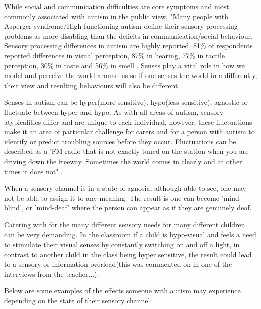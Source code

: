 \documentclass[11pt]{report}
\begin{document}
While social and communication difficulties are core symptoms and most commonly associated with autism in the public view, "Many people with Asperger syndrome/High functioning autism define their sensory processing problems as more disabling than the deficits in communication/social behaviour\cite{olgab}. Sensory processing differences in autism are highly reported, 81\% of respondents reported differences in visual perception, 87\% in hearing, 77\% in tactile perception, 30\% in taste and 56\% in smell \cite{sensory_leisure}. Senses play a vital role in how we model and perceive the world around us so if one senses the world in a differently, their view and resulting behaviours will also be different. 

Senses in autism can be hyper(more sensitive), hypo(less sensitive), agnostic or fluctuate between hyper and hypo\cite{bayes}. As with all areas of autism, sensory atypicalities differ and are unique to each individual, however, these fluctuations make it an area of particular challenge for carers and for a person with autism to identify or predict troubling sources before they occur. Fluctuations can be described as a 'FM radio that is not exactly tuned on the station when you are driving down the freeway. Sometimes the world comes in clearly and at other times it does not" \cite{olgab}.

When a sensory channel is in a state of agnosia, although able to see, one may not be able to assign it to any meaning. The result is one can become 'mind-blind', or 'mind-deaf' where the person can appear as if they are genuinely deaf.

Catering with for the many different sensory needs for many different children can be very demanding. In the classroom if a child is hypo-visual and feels a need to stimulate their visual senses by constantly switching on and off a light, in contrast to another child in the class being hyper sensitive, the result could lead to a sensory or information overload(this was commented on in one of the interviews from the teacher...).

Below are some examples of the effects someone with autism may experience depending on the state of their sensory channel:
\end{document}
